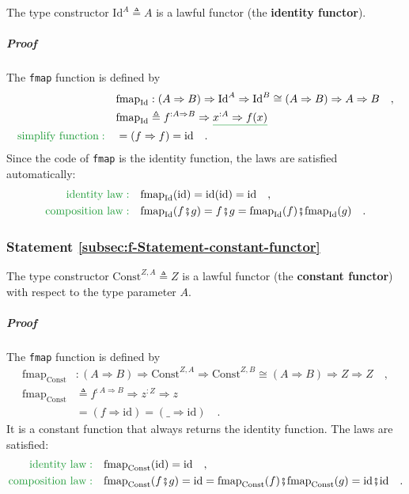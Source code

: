 The type constructor $\text{Id}^{A}\triangleq A$
is a lawful functor (the \textbf{identity functor}).

\subparagraph{Proof}

The \lstinline!fmap! function is defined by
\begin{align*}
 & \text{fmap}_{\text{Id}}:\left(A\Rightarrow B\right)\Rightarrow\text{Id}^{A}\Rightarrow\text{Id}^{B}\cong\left(A\Rightarrow B\right)\Rightarrow A\Rightarrow B\quad,\\
 & \text{fmap}_{\text{Id}}\triangleq f^{:A\Rightarrow B}\Rightarrow\gunderline{x^{:A}\Rightarrow f(x)}\\
{\color{greenunder}\text{simplify function}:}\quad & =\left(f\Rightarrow f\right)=\text{id}\quad.
\end{align*}
Since the code of \lstinline!fmap! is the identity function, the
laws are satisfied automatically:
\begin{align*}
{\color{greenunder}\text{identity law}:}\quad & \text{fmap}_{\text{Id}}(\text{id})=\text{id}(\text{id})=\text{id}\quad,\\
{\color{greenunder}\text{composition law}:}\quad & \text{\ensuremath{\text{fmap}_{\text{Id}}}}(f\bef g)=f\bef g=\text{fmap}_{\text{Id}}(f)\bef\text{fmap}_{\text{Id}}(g)\quad.
\end{align*}


\subsubsection{Statement \label{subsec:f-Statement-constant-functor}\ref{subsec:f-Statement-constant-functor}}

The type constructor $\text{Const}^{Z,A}\triangleq Z$
is a lawful functor (the \textbf{constant functor}) with respect to
the type parameter $A$.

\subparagraph{Proof}

The \lstinline!fmap! function is defined by
\begin{align*}
\text{fmap}_{\text{Const}} & :\left(A\Rightarrow B\right)\Rightarrow\text{Const}^{Z,A}\Rightarrow\text{Const}^{Z,B}\cong\left(A\Rightarrow B\right)\Rightarrow Z\Rightarrow Z\quad,\\
\text{fmap}_{\text{Const}} & \triangleq f^{:A\Rightarrow B}\Rightarrow z^{:Z}\Rightarrow z\\
 & =\left(f\Rightarrow\text{id}\right)=\left(\_\Rightarrow\text{id}\right)\quad.
\end{align*}
It is a constant function that always returns the identity function.
The laws are satisfied:
\begin{align*}
{\color{greenunder}\text{identity law}:}\quad & \text{fmap}_{\text{Const}}(\text{id})=\text{id}\quad,\\
{\color{greenunder}\text{composition law}:}\quad & \text{\ensuremath{\text{fmap}_{\text{Const}}}}(f\bef g)=\text{id}=\text{fmap}_{\text{Const}}(f)\bef\text{fmap}_{\text{Const}}(g)=\text{id}\bef\text{id}\quad.
\end{align*}


